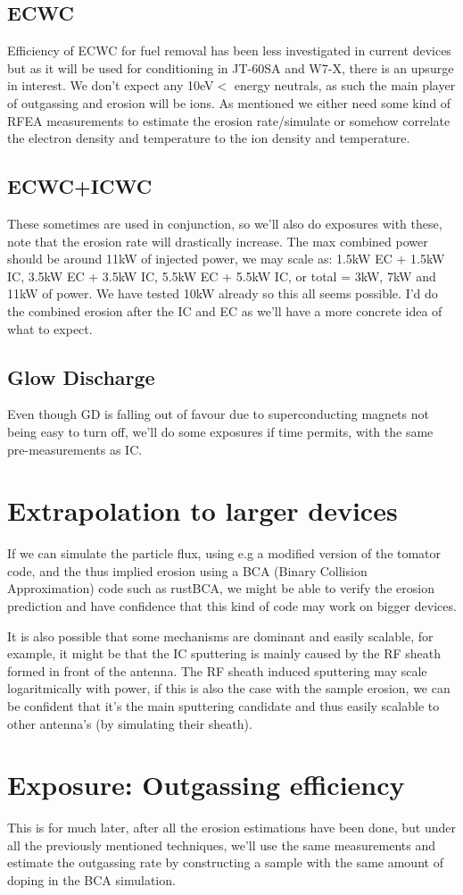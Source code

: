 \documentclass{article}
\begin{document}
\subsection{ECWC}
Efficiency of ECWC for fuel removal has been less investigated in current
devices but as it will be used for conditioning in JT-60SA and W7-X, there is
an upsurge in interest. We don't expect any 10eV$<$ energy neutrals, as such
the main player of outgassing and erosion will be ions.  As mentioned we either
need some kind of RFEA measurements to estimate the erosion rate/simulate or somehow
correlate the electron density and temperature to the ion density and
temperature.
\subsection{ECWC+ICWC}
These sometimes are used in conjunction, so we'll also do exposures with these,
note that the erosion rate will drastically increase. The max combined power
should be around 11kW of injected power, we may scale as: 1.5kW EC + 1.5kW IC,
3.5kW EC + 3.5kW IC, 5.5kW EC + 5.5kW IC, or total = 3kW, 7kW and 11kW of
power. We have tested 10kW already so this all seems possible.  I'd do the
combined erosion after the IC and EC as we'll have a more concrete idea of what
to expect.
\subsection{Glow Discharge}
Even though GD is falling out of favour due to superconducting magnets not
being easy to turn off, we'll do some exposures if time permits, with the same
pre-measurements as IC.
\section{Extrapolation to larger devices}
If we can simulate the particle flux, using e.g a modified version of the
tomator code, and the thus implied erosion using a BCA (Binary Collision
Approximation) code such as rustBCA, we might be able to verify the erosion
prediction and have confidence that this kind of code may work on
bigger devices.

It is also possible that some mechanisms are dominant and easily scalable, for
example, it might be that the IC sputtering is mainly caused by the RF sheath
formed in front of the antenna.  The RF sheath induced sputtering may scale
logaritmically with power, if this is also the case with the sample erosion, we
can be confident that it's the main sputtering candidate and thus easily
scalable to other antenna's (by simulating their sheath).

\section{Exposure: Outgassing efficiency}
This is for much later, after all the erosion estimations have been done, but
under all the previously mentioned techniques, we'll use the same measurements
and estimate the outgassing rate by constructing a sample with the same amount
of doping in the BCA simulation.
\end{document}
